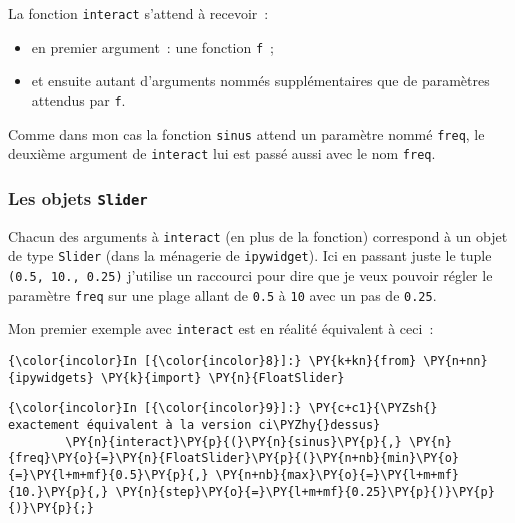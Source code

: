     La fonction \texttt{interact} s'attend à recevoir~:

\begin{itemize}
\tightlist
\item
  en premier argument~: une fonction \texttt{f}~;
\item
  et ensuite autant d'arguments nommés supplémentaires que de paramètres
  attendus par \texttt{f}.
\end{itemize}

Comme dans mon cas la fonction \texttt{sinus} attend un paramètre nommé
\texttt{freq}, le deuxième argument de \texttt{interact} lui est passé
aussi avec le nom \texttt{freq}.

    \hypertarget{les-objets-slider}{%
\subsubsection{\texorpdfstring{Les objets
\texttt{Slider}}{Les objets Slider}}\label{les-objets-slider}}

    Chacun des arguments à \texttt{interact} (en plus de la fonction)
correspond à un objet de type \texttt{Slider} (dans la ménagerie de
\texttt{ipywidget}). Ici en passant juste le tuple
\texttt{(0.5,\ 10.,\ 0.25)} j'utilise un raccourci pour dire que je veux
pouvoir régler le paramètre \texttt{freq} sur une plage allant de
\texttt{0.5} à \texttt{10} avec un pas de \texttt{0.25}.

    Mon premier exemple avec \texttt{interact} est en réalité équivalent à
ceci~:

    \begin{Verbatim}[commandchars=\\\{\},frame=single,framerule=0.3mm,rulecolor=\color{cellframecolor}]
{\color{incolor}In [{\color{incolor}8}]:} \PY{k+kn}{from} \PY{n+nn}{ipywidgets} \PY{k}{import} \PY{n}{FloatSlider}
\end{Verbatim}


    \begin{Verbatim}[commandchars=\\\{\},frame=single,framerule=0.3mm,rulecolor=\color{cellframecolor}]
{\color{incolor}In [{\color{incolor}9}]:} \PY{c+c1}{\PYZsh{} exactement équivalent à la version ci\PYZhy{}dessus}
        \PY{n}{interact}\PY{p}{(}\PY{n}{sinus}\PY{p}{,} \PY{n}{freq}\PY{o}{=}\PY{n}{FloatSlider}\PY{p}{(}\PY{n+nb}{min}\PY{o}{=}\PY{l+m+mf}{0.5}\PY{p}{,} \PY{n+nb}{max}\PY{o}{=}\PY{l+m+mf}{10.}\PY{p}{,} \PY{n}{step}\PY{o}{=}\PY{l+m+mf}{0.25}\PY{p}{)}\PY{p}{)}\PY{p}{;}
\end{Verbatim}


